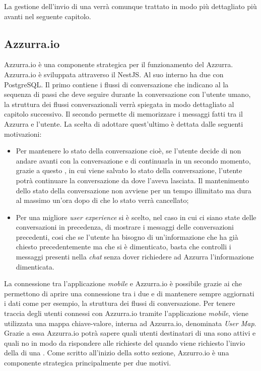 \begin{trivlist}
	La gestione dell'invio di una  verrà comunque trattato in modo più dettagliato più avanti nel seguente capitolo.
	\item \subsection{Azzurra.io}
	Azzurra.io è una componente strategica per il funzionamento del  Azzurra. Azzurra.io è sviluppata attraverso il  NestJS. Al suo interno ha due  con  PostgreSQL. Il primo  contiene i flussi di conversazione che indicano al  la sequenza di passi che deve seguire durante la conversazione con l'utente umano, la struttura dei flussi conversazionali verrà spiegata in modo dettagliato al capitolo successivo. Il secondo  permette di memorizzare i messaggi fatti tra il  Azzurra e l'utente. La scelta di adottare quest'ultimo  è dettata dalle seguenti motivazioni:
	\begin{itemize}
		\item Per mantenere lo stato della conversazione cioè, se l'utente decide di non andare avanti con la conversazione e di continuarla in un secondo momento, grazie a questo , in cui viene salvato lo stato della conversazione, l'utente potrà continuare la conversazione da dove l'aveva lasciata. Il mantenimento dello stato della conversazione non avviene per un tempo illimitato ma dura al massimo un'ora dopo di che lo stato verrà cancellato;
		\item Per una migliore \emph{user experience} si è scelto, nel caso in cui ci siano state delle conversazioni in precedenza, di mostrare i messaggi delle conversazioni precedenti, cosi che se l'utente ha bisogno di un’informazione che ha già chiesto precedentemente ma che si è dimenticato, basta che controlli i messaggi presenti nella \emph{chat} senza dover richiedere ad Azzurra l'informazione dimenticata.
	\end{itemize}
	La connessione tra l'applicazione \emph{mobile} e Azzurra.io è possibile grazie ai  che permettono di aprire una connessione tra i due e di mantenere sempre aggiornati i dati come per esempio, la struttura dei flussi di conversazione. Per tenere traccia degli utenti connessi con Azzurra.io tramite l'applicazione \emph{mobile}, viene utilizzata una mappa chiave-valore, interna ad Azzurra.io, denominata \emph{User Map}. Grazie a essa Azzurra.io potrà sapere quali utenti destinatari di una  sono attivi e quali no in modo da rispondere alle richieste del  quando viene richiesto l'invio della di una . Come scritto all'inizio della sotto sezione, Azzurro.io è una componente strategica principalmente per due motivi.

\end{trivlist}
